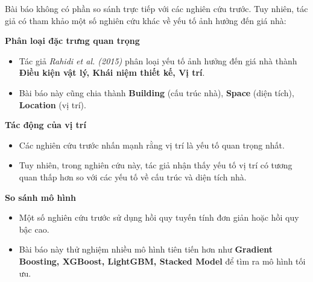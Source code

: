 Bài báo không có phần so sánh trực tiếp với các nghiên cứu trước. Tuy nhiên, tác giả có tham khảo một số nghiên cứu khác về yếu tố ảnh hưởng đến giá nhà:

\textbf{\large Phân loại đặc trưng quan trọng}
\begin{itemize}
    \item Tác giả \textit{Rahidi et al. (2015)} phân loại yếu tố ảnh hưởng đến giá nhà thành \textbf{Điều kiện vật lý, Khái niệm thiết kế, Vị trí}.
    \item Bài báo này cũng chia thành \textbf{Building} (cấu trúc nhà), \textbf{Space} (diện tích), \textbf{Location} (vị trí).
\end{itemize}

\textbf{\large Tác động của vị trí}
\begin{itemize}
    \item Các nghiên cứu trước nhấn mạnh rằng vị trí là yếu tố quan trọng nhất.
    \item Tuy nhiên, trong nghiên cứu này, tác giả nhận thấy yếu tố vị trí có tương quan thấp hơn so với các yếu tố về cấu trúc và diện tích nhà.
\end{itemize}

\textbf{\large So sánh mô hình}
\begin{itemize}
    \item Một số nghiên cứu trước sử dụng hồi quy tuyến tính đơn giản hoặc hồi quy bậc cao.
    \item Bài báo này thử nghiệm nhiều mô hình tiên tiến hơn như \textbf{Gradient Boosting, XGBoost, LightGBM, Stacked Model} để tìm ra mô hình tối ưu.
\end{itemize}
